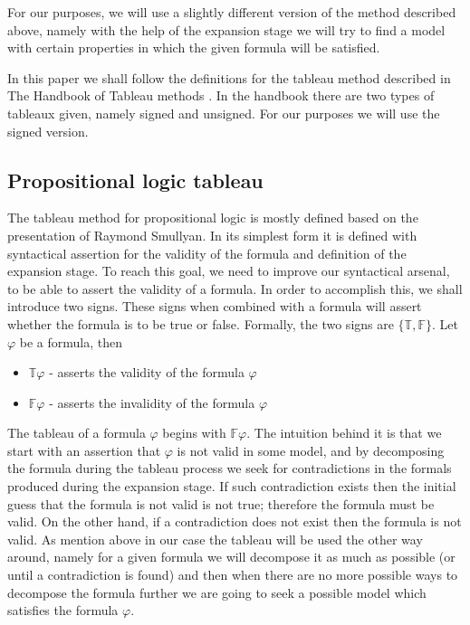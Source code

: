 \documentclass{article}
\newcommand{\signT}{\mathbb{T}}
\newcommand{\signF}{\mathbb{F}}
\begin{document}
For our purposes, we will use a slightly different version of the method described above, namely with the help of the expansion stage we will try to find a model with certain properties in which the given formula will be satisfied.

In this paper we shall follow the definitions for the tableau method described in The Handbook of Tableau methods \cite{tableau-handbook}. In the handbook there are two types of tableaux given, namely signed and unsigned. For our purposes we will use the signed version.

		\subsection{Propositional logic tableau}
The tableau method for propositional logic is mostly defined based on the presentation of Raymond Smullyan. In its simplest form it is defined with syntactical assertion for the validity of the formula and definition of the expansion stage. To reach this goal, we need to improve our syntactical arsenal, to be able to assert the validity of a formula. In order to accomplish this, we shall introduce two signs. These signs when combined with a formula will assert whether the formula is to be true or false. Formally, the two signs are $\{ \signT, \signF \}$. Let $\varphi$ be a formula, then
\begin{itemize}
	\item $\signT \varphi$ - asserts the validity of the formula $\varphi$
	\item $\signF \varphi$ - asserts the invalidity of the formula $\varphi$
\end{itemize} 

The tableau of a formula $\varphi$ begins with $\signF \varphi$. The intuition behind it is that we start with an assertion that $\varphi$ is not valid in some model, and by decomposing the formula during the tableau process we seek for contradictions in the formals produced during the expansion stage. If such contradiction exists then the initial guess that the formula is not valid is not true; therefore the formula must be valid. On the other hand, if a contradiction does not exist then the formula is not valid. As mention above in our case the tableau will be used the other way around, namely for a given formula we will decompose it as much as possible (or until a contradiction is found) and then when there are no more possible ways to decompose the formula further we are going to seek a possible model which satisfies the formula $\varphi$. 
\end{document}
